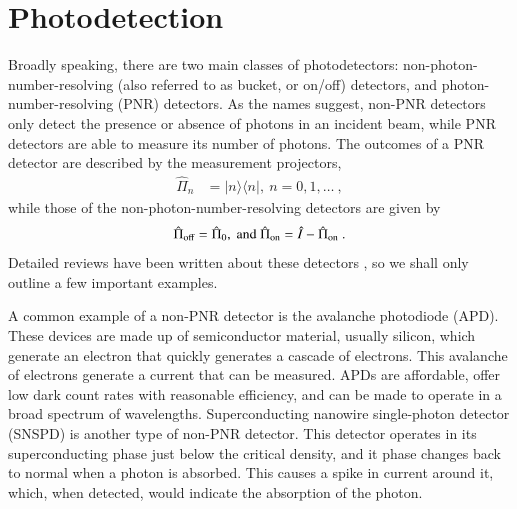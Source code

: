 \documentclass[times,final]{elsarticle}
\newcommand{\bra}[1]{\langle#1|}
\newcommand{\ket}[1]{|#1\rangle}
\begin{document}
\section{Photodetection}\label{sec:detector}

Broadly speaking, there are two main classes of photodetectors: non-photon-number-resolving (also referred to as bucket, or on/off) detectors, and photon-number-resolving (PNR) detectors. As the names suggest, non-PNR detectors only detect the presence or absence of photons in an incident beam, while PNR detectors are able to measure its number of photons. The outcomes of a PNR detector are described by the measurement projectors,
\begin{align}
\hat\Pi_n &= \ket{n}\bra{n}, \ n=0,1,\ldots \ ,
\end{align}
while those of the non-photon-number-resolving detectors are given by
\begin{align}
\hat\Pi_\text{off} = \hat\Pi_0, \ {\rm and} \ \hat\Pi_\text{on} = \hat{I} - \hat\Pi_\text{on}\ .
\end{align}
Detailed reviews have been written about these detectors \cite{bib:Hadfield09,bib:Eisaman11}, so we shall only outline a few important examples. 

A common example of a non-PNR detector is the avalanche photodiode (APD). These devices are made up of semiconductor material, usually silicon, which generate an electron that quickly generates a cascade of electrons. This avalanche of electrons generate a current that can be measured. APDs are affordable, offer low dark count rates with reasonable efficiency, and can be made to operate in a broad spectrum of wavelengths.
Superconducting nanowire single-photon detector (SNSPD) is another  type of non-PNR detector. This detector operates in its superconducting phase just below the critical density, and it phase changes back to normal when a photon is absorbed. This causes a spike in current around it, which, when detected, would indicate the absorption of the photon.
\end{document}
